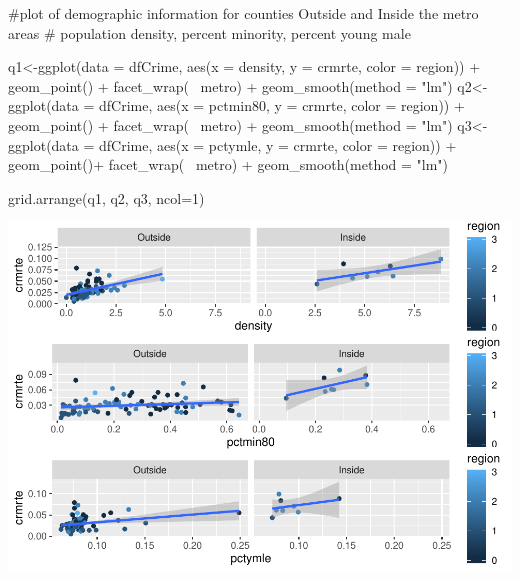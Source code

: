 \documentclass[]{article}
\newenvironment{Shaded}{}{}
\newcommand{\CommentTok}[1]{\textcolor[rgb]{0.00,0.50,0.00}{#1}}
\newcommand{\DataTypeTok}[1]{#1}
\newcommand{\DecValTok}[1]{#1}
\newcommand{\KeywordTok}[1]{\textcolor[rgb]{0.00,0.00,1.00}{#1}}
\newcommand{\NormalTok}[1]{#1}
\newcommand{\OperatorTok}[1]{#1}
\newcommand{\StringTok}[1]{\textcolor[rgb]{0.00,0.50,0.50}{#1}}
\begin{document}
\begin{Shaded}
\begin{Highlighting}[]
\CommentTok{#plot of demographic information for counties Outside and Inside the metro areas}
\CommentTok{# population density, percent minority, percent young male}

\NormalTok{q1<-}\KeywordTok{ggplot}\NormalTok{(}\DataTypeTok{data =}\NormalTok{ dfCrime, }\KeywordTok{aes}\NormalTok{(}\DataTypeTok{x =}\NormalTok{ density, }\DataTypeTok{y =}\NormalTok{ crmrte, }\DataTypeTok{color =}\NormalTok{ region)) }\OperatorTok{+}\StringTok{ }
\StringTok{      }\KeywordTok{geom_point}\NormalTok{() }\OperatorTok{+}\StringTok{ }\KeywordTok{facet_wrap}\NormalTok{(}\OperatorTok{~}\StringTok{ }\NormalTok{metro) }\OperatorTok{+}
\StringTok{  }\KeywordTok{geom_smooth}\NormalTok{(}\DataTypeTok{method =} \StringTok{"lm"}\NormalTok{)}
\NormalTok{q2<-}\KeywordTok{ggplot}\NormalTok{(}\DataTypeTok{data =}\NormalTok{ dfCrime, }\KeywordTok{aes}\NormalTok{(}\DataTypeTok{x =}\NormalTok{ pctmin80, }\DataTypeTok{y =}\NormalTok{ crmrte, }\DataTypeTok{color =}\NormalTok{ region)) }\OperatorTok{+}\StringTok{ }
\StringTok{      }\KeywordTok{geom_point}\NormalTok{() }\OperatorTok{+}\StringTok{ }\KeywordTok{facet_wrap}\NormalTok{(}\OperatorTok{~}\StringTok{ }\NormalTok{metro) }\OperatorTok{+}
\StringTok{  }\KeywordTok{geom_smooth}\NormalTok{(}\DataTypeTok{method =} \StringTok{"lm"}\NormalTok{)}
\NormalTok{q3<-}\KeywordTok{ggplot}\NormalTok{(}\DataTypeTok{data =}\NormalTok{ dfCrime, }\KeywordTok{aes}\NormalTok{(}\DataTypeTok{x =}\NormalTok{ pctymle, }\DataTypeTok{y =}\NormalTok{ crmrte, }\DataTypeTok{color =}\NormalTok{ region)) }\OperatorTok{+}\StringTok{ }
\StringTok{      }\KeywordTok{geom_point}\NormalTok{()}\OperatorTok{+}\StringTok{ }\KeywordTok{facet_wrap}\NormalTok{(}\OperatorTok{~}\StringTok{ }\NormalTok{metro) }\OperatorTok{+}
\StringTok{  }\KeywordTok{geom_smooth}\NormalTok{(}\DataTypeTok{method =} \StringTok{"lm"}\NormalTok{)}

\KeywordTok{grid.arrange}\NormalTok{(q1, q2, q3, }\DataTypeTok{ncol=}\DecValTok{1}\NormalTok{)}
\end{Highlighting}
\end{Shaded}

\includegraphics{Bagnard_Gaustad_Hartman_Leung_Lab_3_files/figure-latex/unnamed-chunk-26-1.pdf}
\end{document}
